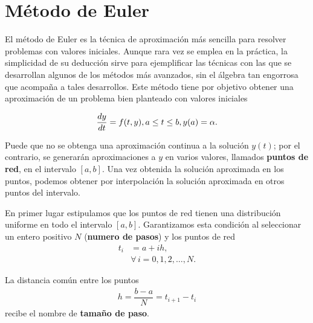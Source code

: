 \section{Método de Euler}
El método de Euler es la técnica de aproximación más sencilla para resolver problemas con valores iniciales. Aunque rara vez 
se emplea en la práctica, la simplicidad de su deducción sirve para ejemplificar las técnicas con las que se desarrollan 
algunos de los métodos más avanzados, sin el álgebra tan engorrosa que acompaña a tales desarrollos.
Este método tiene por objetivo obtener una aproximación de un problema bien planteado con valores iniciales

\begin{equation}
	{dy\over dt} = f(t,y), \\ 
	a\leq t\leq b, \\ 
	y(a) = \alpha.
	\label{eq:PVIBienPlanteado}
\end{equation}

Puede que no se obtenga una aproximación continua a la solución $y(t)$; por el contrario, se generarán aproximaciones a $y$ 
en varios valores, llamados \textbf{puntos de red}, en el intervalo $[a,b]$. Una vez obtenida la solución aproximada en los 
puntos, podemos obtener por interpolación la solución aproximada en otros puntos del intervalo.

En primer lugar estipulamos que los puntos de red tienen una distribución uniforme en todo el intervalo $[a,b]$. Garantizamos 
esta condición al seleccionar un entero positivo $N$ (\textbf{numero de pasos}) y los puntos de red
\begin{align*}
	t_i &= a + ih, \\
	&\forall\, i=0,1,2,\dots,N.
\end{align*}

La distancia común entre los puntos 
\begin{align*}
	h=\dfrac{b-a}{N} = t_{i+1}-t_i
\end{align*}
recibe el nombre de \textbf{tamaño de paso}. 

